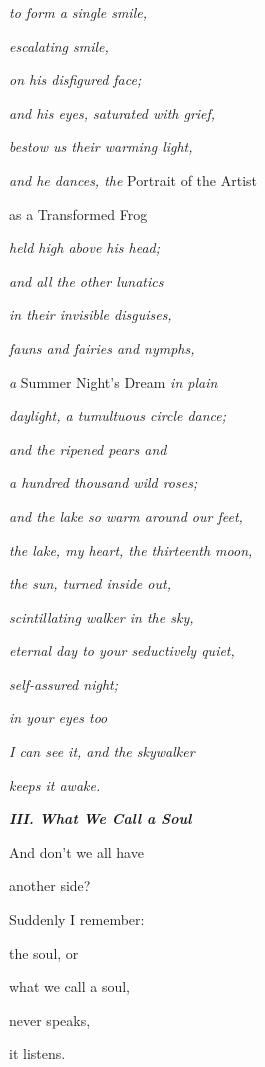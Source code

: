\documentclass[a4paper]{article}
\begin{document}
{\itshape
to form a single smile,}

{\itshape
escalating smile,}

{\itshape
on his disfigured face;}

{\itshape
and his eyes, saturated with grief,}

{\itshape
bestow us their warming light,}

\textit{and he dances, the }Portrait of the Artist

as a Transformed Frog

{\itshape
held high above his head;}

{\itshape
and all the other lunatics}

{\itshape
in their invisible disguises,}

{\itshape
fauns and fairies and nymphs,}

\textit{a }Summer Night’s Dream \textit{in plain}

{\itshape
daylight, a tumultuous circle dance;}

{\itshape
and the ripened pears and}

{\itshape
a hundred thousand wild roses;}

{\itshape
and the lake so warm around our feet,}

{\itshape
the lake, my heart, the thirteenth moon, }

{\itshape
the sun, turned inside out,}

{\itshape
scintillating walker in the sky, }

{\itshape
eternal day to your seductively quiet,}

{\itshape
self-assured night; }

{\itshape
in your eyes too}

{\itshape
I can see it, and the skywalker}

{\itshape
keeps it awake.}


\bigskip

{\bfseries\itshape
III. What We Call a Soul}


\bigskip

And don’t we all have

another side?


\bigskip

Suddenly I remember:

the soul, or

what we call a soul,

never speaks,

it listens.


\bigskip
\end{document}
